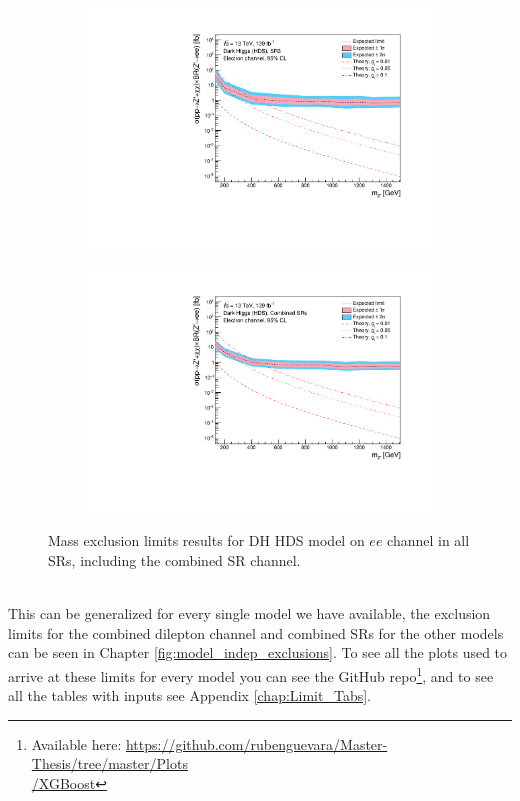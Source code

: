 \documentclass[12pt, a4paper]{book}
\begin{document}
\begin{figure}[!ht]
\begin{subfigure}[b]{0.49\textwidth}
   \end{subfigure}
   \hfill
	\begin{subfigure}[b]{0.49\textwidth}
      \centering
      \includegraphics[width=1\textwidth]{Limits/Model_independent/150/DH_HDS/mass_exclusion_ee.pdf}
   \end{subfigure}
   \hfil\begin{subfigure}[b]{0.49\textwidth}
    \centering
    \includegraphics[width=1\textwidth]{Limits/Model_independent/DH_HDS/mass_exclusion_ee.pdf}
 \end{subfigure}
   \caption[Electron channel mass exclusions in DH HDS using the model independent approach]{Mass exclusion limits results for DH HDS model on $ee$ channel in all SRs, including the combined SR channel.}\label{fig:DH_HDS_me_SRS}
\end{figure} 
\\ This can be generalized for every single model we have available, the exclusion limits for the combined dilepton channel and combined SRs for the other models can be seen in Chapter \ref{fig:model_indep_exclusions}. 
To see all the plots used to arrive at these limits for every model you can see the GitHub repo\footnote{Available here: \href{https://github.com/rubenguevara/Master-Thesis/tree/master/Plots/XGBoost}{https://github.com/rubenguevara/Master-Thesis/tree/master/Plots\\/XGBoost}}, 
and to see all the tables with inputs see Appendix \ref{chap:Limit_Tabs}.
\end{document}
